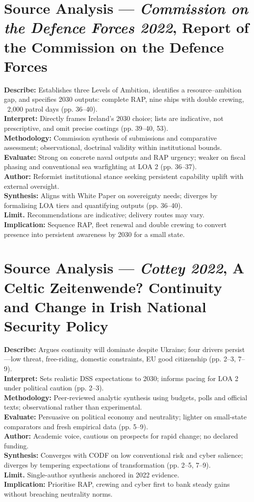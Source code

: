 \section*{Source Analysis — \textit{Commission on the Defence Forces 2022}, Report of the Commission on the Defence Forces}
\textbf{Describe:} Establishes three Levels of Ambition, identifies a resource–ambition gap, and specifies 2030 outputs: complete RAP, nine ships with double crewing, ~2,000 patrol days (pp. 36–40).\\
\textbf{Interpret:} Directly frames Ireland’s 2030 choice; lists are indicative, not prescriptive, and omit precise costings (pp. 39–40, 53).\\
\textbf{Methodology:} Commission synthesis of submissions and comparative assessment; observational, doctrinal validity within institutional bounds.\\
\textbf{Evaluate:} Strong on concrete naval outputs and RAP urgency; weaker on fiscal phasing and conventional sea warfighting at LOA 2 (pp. 36–37).\\
\textbf{Author:} Reformist institutional stance seeking persistent capability uplift with external oversight.\\
\textbf{Synthesis:} Aligns with White Paper on sovereignty needs; diverges by formalising LOA tiers and quantifying outputs (pp. 36–40).\\
\textbf{Limit.} Recommendations are indicative; delivery routes may vary.\\
\textbf{Implication:} Sequence RAP, fleet renewal and double crewing to convert presence into persistent awareness by 2030 for a small state.

\section*{Source Analysis — \textit{Cottey 2022}, A Celtic Zeitenwende? Continuity and Change in Irish National Security Policy}
\textbf{Describe:} Argues continuity will dominate despite Ukraine; four drivers persist—low threat, free-riding, domestic constraints, EU good citizenship (pp. 2–3, 7–9).\\
\textbf{Interpret:} Sets realistic DSS expectations to 2030; informs pacing for LOA 2 under political caution (pp. 2–3).\\
\textbf{Methodology:} Peer-reviewed analytic synthesis using budgets, polls and official texts; observational rather than experimental.\\
\textbf{Evaluate:} Persuasive on political economy and neutrality; lighter on small-state comparators and fresh empirical data (pp. 5–9).\\
\textbf{Author:} Academic voice, cautious on prospects for rapid change; no declared funding.\\
\textbf{Synthesis:} Converges with CODF on low conventional risk and cyber salience; diverges by tempering expectations of transformation (pp. 2–5, 7–9).\\
\textbf{Limit.} Single-author synthesis anchored in 2022 evidence.\\
\textbf{Implication:} Prioritise RAP, crewing and cyber first to bank steady gains without breaching neutrality norms.

